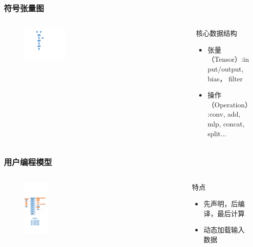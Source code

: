 \documentclass[12pt]{ctexbeamer}
\begin{document}
\begin{frame}
  \frametitle{符号张量图}
  \begin{columns}
    \begin{column}{0.50\textwidth}
       \begin{figure}
		\includegraphics[width=0.3\textwidth]{figures/computing_graph.pdf}
       \end{figure}
    \end{column}    
    \begin{column}{0.50\textwidth}
    \begin{block}{核心数据结构}
       \begin{itemize}
          \item 张量（Tensor）:input/output, bias， filter
          \item 操作（Operation）:conv, add, mlp, concat, split...
        \end{itemize}
      \end{block}
    \end{column}
  \end{columns}
\end{frame}

\begin{frame}
  \frametitle{用户编程模型}
  \begin{columns}
    \begin{column}{0.50\textwidth}
       \begin{figure}
		\includegraphics[width=0.18\textwidth]{figures/user_coding_process.pdf}
       \end{figure}
    \end{column}    
    \begin{column}{0.50\textwidth}
    \begin{block}{特点}
       \begin{itemize}
          \item 先声明，后编译，最后计算
          \item 动态加载输入数据
        \end{itemize}
      \end{block}
    \end{column}
  \end{columns}
\end{frame}
\end{document}
